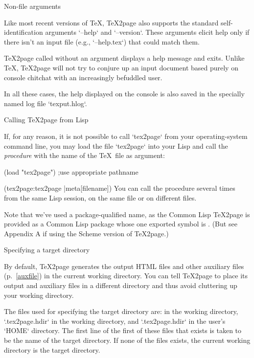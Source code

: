\beginsection Non-file arguments

%
%
Like most recent versions of \TeX, \TeX2page also
supports the standard self-identification
arguments `--help` and `--version`.  These
arguments elicit help only if there isn’t an input file
(e.g., `--help.tex`) that could match them.

\TeX2page called without an argument displays a help
message and exits.  Unlike \TeX, \TeX2page will not try
to conjure up an input document based purely on console
chitchat with an increasingly befuddled user.

In all these cases, the help displayed on the console
is also saved in the specially named log file
`texput.hlog`.

\beginsection Calling \TeX2page from Lisp

%
If, for any reason, it is not possible to call `tex2page`
from your operating-system command line, you may load the
file `tex2page` into your Lisp
and call the
{\em procedure}  with the name of the \TeX\ file
as argument:

\begintts
(load "tex2page") ;use appropriate pathname

(tex2page:tex2page |meta[filename])
\endtt
You can call the procedure
 several times from the same Lisp
session, on the same file or on different files.

Note that we’ve used a package-qualified name, as the Common
Lisp \TeX2page is provided as a Common Lisp package 
whose one exported symbol is . (But see Appendix A if
using the Scheme version of \TeX2page.)

\beginsection Specifying a target directory

%
By default, \TeX2page generates the output HTML files
and other auxiliary files (p.~\ref{auxfile}) in the
current working directory.  You can tell \TeX2page
to place its output and auxiliary files in a different
directory and thus avoid cluttering up your working
directory.

The files used for specifying the target directory are:
 in the working directory,
`.tex2page.hdir` in the working directory, and
`.tex2page.hdir` in the user’s `HOME` directory.
The first line of the first of these files that exists
is taken to be the name of the target directory.
If none of the files exists, the current working
directory is the target directory.

